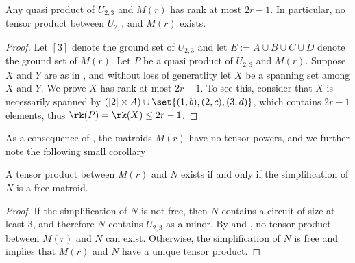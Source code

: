     \begin{proposition}\label{prop:VxU23}
    Any quasi product of $U_{2,3}$ and $M(r)$ has rank at most $2r-1$. In particular, no tensor product between $U_{2,3}$ and $M(r)$ exists.
    \end{proposition}
    \begin{proof}
        Let $[3]$ denote the ground set of $U_{2,3}$ and let $E:=A\cup B\cup C\cup D$ denote the ground set of $M(r)$. Let $P$ be a quasi product of $U_{2,3}$ and $M(r)$. Suppose $X$ and $Y$ are as in , and without loss of generatlity let $X$ be a spanning set among $X$ and $Y$. We prove $X$ has rank at most $2r-1$. To see this, consider that $X$ is necessarily spanned by $([2]\times A)\cup \set{(1,b), (2,c), (3,d)}$, which contains $2r-1$ elements, thus $\rk(P)=\rk(X)\leq 2r-1$.
    \end{proof}
    
    As a consequence of , the matroids $M(r)$ have no tensor powers, and we further note the following small corollary
    
    \begin{corollary}\label{cor:VxU23}
    A tensor product between $M(r)$ and $N$ exists if and only if the simplification of $N$ is a free matroid.
    \end{corollary}
    \begin{proof}
    If the simplification of $N$ is not free, then $N$ contains a circuit of size at least 3, and therefore $N$ contains $U_{2,3}$ as a minor. By  and , no tensor product between $M(r)$ and $N$ can exist. Otherwise, the simplification of $N$ is free and  implies that $M(r)$ and $N$ have a unique tensor product.
    \end{proof}
    
